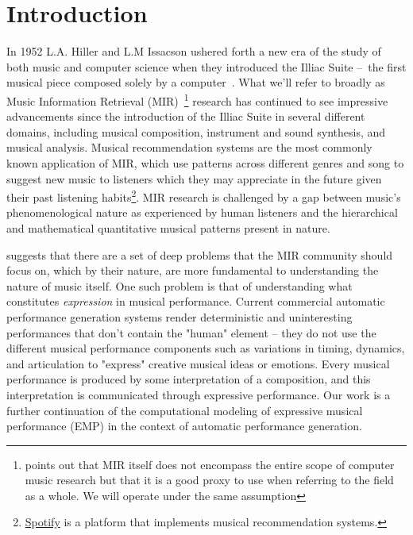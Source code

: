 \chapter{Introduction} \label{ch:introduction}

In 1952 L.A. Hiller and L.M Issacson ushered forth a new era of the study of both music and computer science when they introduced the Illiac Suite – the first musical piece composed solely by a computer~\cite{sandred2009revisiting}. What we'll refer to broadly as Music Information Retrieval (MIR)~\footnote{\citet{widmer2016getting} points out that MIR itself does not encompass the entire scope of computer music research but that it is a good proxy to use when referring to the field as a whole. We will operate under the same assumption} research has continued to see impressive advancements since the introduction of the Illiac Suite in several different domains, including musical composition\cite{briot2017deep}, instrument and sound synthesis\cite{engel2017neural}, and musical analysis\cite{widmer2016getting}. Musical recommendation systems are the most commonly known application of MIR, which use patterns across different genres and song to suggest new music to listeners which they may appreciate in the future given their past listening habits\footnote{\href{https://www.spotify.com/us/}{Spotify}     is a platform that implements musical recommendation systems.}. MIR research is challenged by a gap between music's phenomenological nature as experienced by human listeners and the hierarchical and mathematical quantitative musical patterns present in nature.

\citet{widmer2016getting} suggests that there are a set of deep problems that the MIR community should focus on, which by their nature, are more fundamental to understanding the nature of music itself. One such problem is that of understanding what constitutes \emph{expression} in musical performance. Current commercial automatic performance generation systems render deterministic and uninteresting performances that don't contain the "human" element -- they do not use the different musical performance components such as variations in timing, dynamics, and articulation to "express" creative musical ideas or emotions. Every musical performance is produced by some interpretation of a composition, and this interpretation is communicated through expressive performance. Our work is a further continuation of the computational modeling of expressive musical performance (EMP) in the context of automatic performance generation. 


